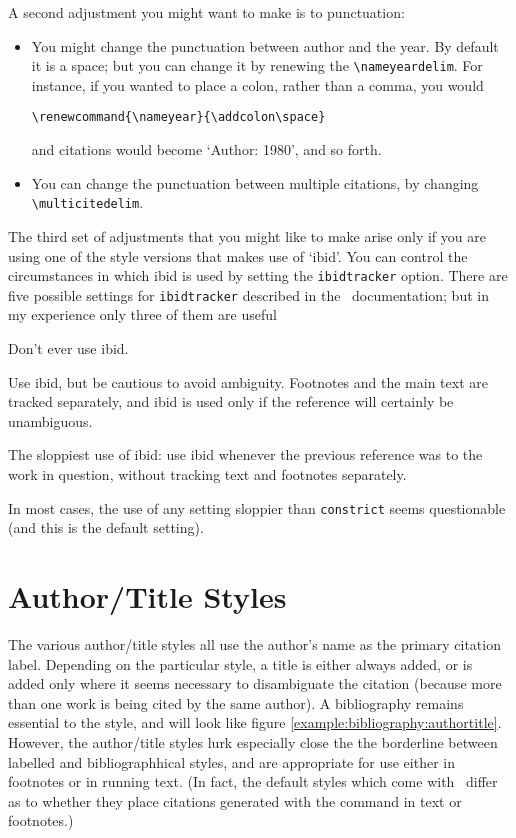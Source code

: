 A second adjustment you might want to make is to punctuation:
\begin{itemize}
\item You might change the punctuation
between author and the year. By default it is a space; but you can
change it by renewing the \verb|\nameyeardelim|. For instance, if you
wanted to place a colon, rather than a comma, you would
\begin{verbatim}
\renewcommand{\nameyear}{\addcolon\space}
\end{verbatim}
and citations would become `Author: 1980', and so forth.
\item You can change the punctuation between multiple citations, by
  changing \verb|\multicitedelim|.
\end{itemize}

The third set of adjustments that you might like to make arise only if
you are using one of the style versions that makes use of `ibid'. You
can control the circumstances in which ibid is used by setting the
\verb|ibidtracker| option.\label{ibidtracking} There are five possible settings for
\verb|ibidtracker| described in the \biblatex\ documentation; but in
my experience only three of them are useful
\begin{description}[font=\ttfamily\upshape]
\item[ibidtracker=false] Don't ever use ibid.
\item[ibidtracker=constrict] Use ibid, but be cautious to avoid
  ambiguity. Footnotes and the main text are tracked separately, and
  ibid is used only if the reference will certainly be unambiguous.
\item[ibidtracker=true] The sloppiest use of ibid: use ibid whenever
  the previous reference was to the work in question, without tracking
  text and footnotes separately.
\end{description}
In most cases, the use of any setting sloppier than \texttt{constrict}
seems questionable (and this is the default setting).




\section{Author/Title Styles}

The various author/title styles all use the author's name as the
primary citation label. Depending on the particular style, a title is
either always added, or is added only where it seems necessary to
disambiguate the citation (because more than one work is being cited
by the same author). A bibliography remains essential to the style,
and will look like figure
\ref{example:bibliography:authortitle}. However, the author/title
styles lurk especially close the the borderline between labelled and
bibliographhical styles, and are appropriate for use either in
footnotes or in running text. (In fact, the default styles which come
with \biblatex\ differ as to whether they place citations generated
with the  command in text or footnotes.)

